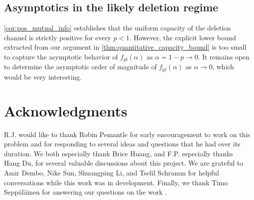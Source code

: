 \documentclass[11pt]{amsart}
\numberwithin{equation}{section}
\numberwithin{equation}{section}
\newcommand{\1}{\mathbbm{1}}
\newcommand{\fpl}{f_{\mathrm{pl}}}
\theoremstyle{definition}
\begin{document}
\subsection{Asymptotics in the likely deletion regime}

\cref{cor:pos_mutual_info} establishes that the uniform capacity of the deletion channel is strictly positive for every $p < 1$. However, the explicit lower bound extracted from our argument in \cref{thm:quantitative_capacity_bound} is too small to capture the asymptotic behavior of $\fpl(\alpha)$ as $\alpha = 1-p \to 0$. It remains open to determine the asymptotic order of magnitude of $\fpl(\alpha)$ as $\alpha \to 0$, which would be very interesting. 

\section*{Acknowledgments}

R.J. would like to thank Robin Pemantle for early encouragement to work on this problem and for responding to several ideas and questions that he had over its duration. We both especially thank Brice Huang, and F.P. especially thanks Hang Du, for several valuable discussions about this project. We are grateful to Amir Dembo, Nike Sun, Shuangping Li, and Tselil Schramm for helpful conversations while this work was in development. Finally, we thank Timo Sepp\"al\"ainen for answering our questions on the work \cite{corwin2015strict}.
\end{document}
